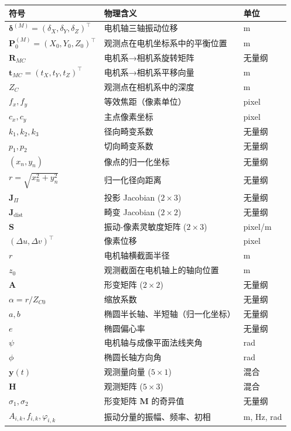 \documentclass[12pt,a4paper]{article}
\begin{document}
\begin{longtable}{p{4cm}p{6cm}p{3cm}}
\toprule
\textbf{符号} & \textbf{物理含义} & \textbf{单位} \\
\midrule
$\boldsymbol{\delta}^{(M)} = (\delta_X, \delta_Y, \delta_Z)^{\top}$ & 电机轴三轴振动位移 & m \\
$\mathbf{P}_0^{(M)} = (X_0, Y_0, Z_0)^{\top}$ & 观测点在电机坐标系中的平衡位置 & m \\
$\mathbf{R}_{MC}$ & 电机系→相机系旋转矩阵 & 无量纲 \\
$\mathbf{t}_{MC} = (t_X, t_Y, t_Z)^{\top}$ & 电机系→相机系平移向量 & m \\
$Z_C$ & 观测点在相机系中的深度 & m \\
$f_x, f_y$ & 等效焦距（像素单位） & pixel \\
$c_x, c_y$ & 主点像素坐标 & pixel \\
$k_1, k_2, k_3$ & 径向畸变系数 & 无量纲 \\
$p_1, p_2$ & 切向畸变系数 & 无量纲 \\
$(x_n, y_n)$ & 像点的归一化坐标 & 无量纲 \\
$r = \sqrt{x_n^2 + y_n^2}$ & 归一化径向距离 & 无量纲 \\
$\mathbf{J}_{\Pi}$ & 投影 Jacobian ($2 \times 3$) & 无量纲 \\
$\mathbf{J}_{\text{dist}}$ & 畸变 Jacobian ($2 \times 2$) & 无量纲 \\
$\mathbf{S}$ & 振动-像素灵敏度矩阵 ($2 \times 3$) & pixel/m \\
$(\Delta u, \Delta v)^{\top}$ & 像素位移 & pixel \\
$r$ & 电机轴横截面半径 & m \\
$z_0$ & 观测截面在电机轴上的轴向位置 & m \\
$\mathbf{A}$ & 形变矩阵 ($2 \times 2$) & 无量纲 \\
$\alpha = r / Z_{C0}$ & 缩放系数 & 无量纲 \\
$a, b$ & 椭圆半长轴、半短轴（归一化坐标） & 无量纲 \\
$e$ & 椭圆偏心率 & 无量纲 \\
$\psi$ & 电机轴与成像平面法线夹角 & rad \\
$\phi$ & 椭圆长轴方向角 & rad \\
$\mathbf{y}(t)$ & 观测量向量 ($5 \times 1$) & 混合 \\
$\mathbf{H}$ & 观测矩阵 ($5 \times 3$) & 混合 \\
$\sigma_1, \sigma_2$ & 形变矩阵 $\mathbf{M}$ 的奇异值 & 无量纲 \\
$A_{i,k}, f_{i,k}, \varphi_{i,k}$ & 振动分量的振幅、频率、初相 & m, Hz, rad \\
\bottomrule
\end{longtable}
\end{document}
